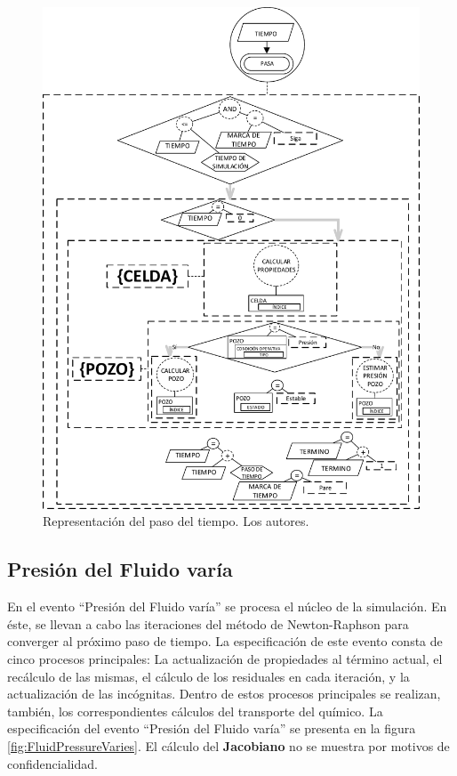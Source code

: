 \begin{figure}[h]
	\centering%
	\includegraphics[width=0.7\linewidth]{Fig/TiempoPasa.pdf}%
	\caption[Representación del paso del tiempo.]{Representación del paso del tiempo. Los autores.} \label{fig:TimePasses}
\end{figure}


\subsection{Presión del Fluido varía}\label{sec:PS_FluidVaries}
En el evento ``Presión del Fluido varía'' se procesa el núcleo de la simulación. En éste, se llevan a cabo las iteraciones del método de Newton-Raphson para converger al próximo paso de tiempo. La especificación de este evento consta de cinco procesos principales: La actualización de propiedades al término actual, el recálculo de las mismas, el cálculo de los residuales en cada iteración, y la actualización de las incógnitas. Dentro de estos procesos principales se realizan, también, los correspondientes cálculos del transporte del químico. La especificación del evento ``Presión del Fluido varía'' se presenta en la figura \ref{fig:FluidPressureVaries}. El cálculo del \textbf{Jacobiano} no se muestra por motivos de confidencialidad.\\

